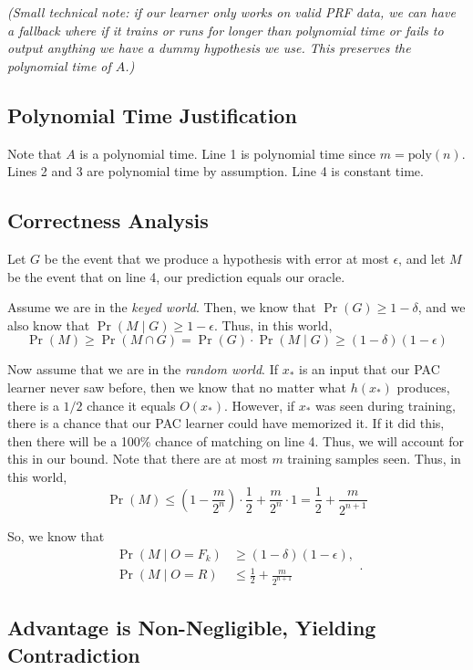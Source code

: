 \documentclass[11pt,fleqn]{article}
\newcommand{\eps}{\epsilon}
\begin{document}
\textit{(Small technical note: if our learner only works on valid PRF data, we can have a fallback where if it trains or runs for longer than polynomial time or fails to output anything we have a dummy hypothesis we use. This preserves the polynomial time of $A$.)}

\subsection*{Polynomial Time Justification}
Note that $A$ is a polynomial time. Line 1 is polynomial time since $m = \text{poly}(n)$. Lines 2 and 3 are polynomial time by assumption. Line 4 is constant time.

\subsection*{Correctness Analysis}

Let $G$ be the event that we produce a hypothesis with error at most $\eps$, and let $M$ be the event that on line 4, our prediction equals our oracle.

Assume we are in the \textit{keyed world}. Then, we know that $\Pr(G) \geq 1 - \delta$, and we also know that $\Pr(M \mid G) \geq 1 - \eps$. Thus, in this world,
\[\Pr(M ) \geq \Pr(M \cap G) = \Pr(G) \cdot \Pr(M \mid G) \geq (1 - \delta) (1 - \eps)\]

Now assume that we are in the \textit{random world}. If $x_*$ is an input that our PAC learner never saw before, then we know that no matter what $h(x_*)$ produces, there is a $1/2$ chance it equals $O(x_*)$. However, if $x_*$ was seen during training, there is a chance that our PAC learner could have memorized it. If it did this, then there will be a 100\% chance of matching on line 4. Thus, we will account for this in our bound. Note that there are at most $m$ training samples seen. Thus, in this world,
\[\Pr(M ) \leq \left(1 - \frac{m}{2^n}\right) \cdot \frac{1}{2} + \frac{m}{2^n} \cdot 1 = \frac{1}{2} + \frac{m}{2^{n+1}}\]

So, we know that
\[
\boxed{\begin{aligned}
    \Pr(M \mid O = F_k) &\geq (1 - \delta) (1 - \eps), \\
    \Pr(M \mid O = R) &\leq \frac{1}{2} + \frac{m}{2^{n+1}}
\end{aligned}}.
\]
\subsection*{Advantage is Non-Negligible, Yielding Contradiction}
\end{document}
